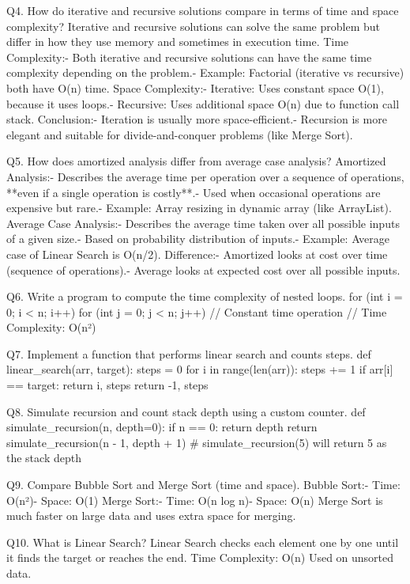 Q4. How do iterative and recursive solutions compare in terms of time and space
 complexity?
 Iterative and recursive solutions can solve the same problem but differ in how they use memory and
 sometimes in execution time.
 Time Complexity:- Both iterative and recursive solutions can have the same time complexity depending on the
 problem.- Example: Factorial (iterative vs recursive) both have O(n) time.
 Space Complexity:- Iterative: Uses constant space O(1), because it uses loops.- Recursive: Uses additional space O(n) due to function call stack.
 Conclusion:- Iteration is usually more space-efficient.- Recursion is more elegant and suitable for divide-and-conquer problems (like Merge Sort).


 Q5. How does amortized analysis differ from average case analysis?
 Amortized Analysis:- Describes the average time per operation over a sequence of operations, **even if a single
 operation is costly**.- Used when occasional operations are expensive but rare.- Example: Array resizing in dynamic array (like ArrayList).
 Average Case Analysis:- Describes the average time taken over all possible inputs of a given size.- Based on probability distribution of inputs.- Example: Average case of Linear Search is O(n/2).
 Difference:- Amortized looks at cost over time (sequence of operations).- Average looks at expected cost over all possible inputs.


 Q6. Write a program to compute the time complexity of nested loops.
 for (int i = 0; i < n; i++) {
 for (int j = 0; j < n; j++) {
 // Constant time operation
 }
 }
 // Time Complexity: O(n²)


 Q7. Implement a function that performs linear search and counts steps.
 def linear_search(arr, target):
 steps = 0
 for i in range(len(arr)):
 steps += 1
 if arr[i] == target:
 return i, steps
 return -1, steps


 Q8. Simulate recursion and count stack depth using a custom counter.
def simulate_recursion(n, depth=0):
 if n == 0:
 return depth
 return simulate_recursion(n - 1, depth + 1)
 # simulate_recursion(5) will return 5 as the stack depth


 Q9. Compare Bubble Sort and Merge Sort (time and space).
 Bubble Sort:- Time: O(n²)- Space: O(1)
 Merge Sort:- Time: O(n log n)- Space: O(n)
 Merge Sort is much faster on large data and uses extra space for merging.


 Q10. What is Linear Search?
 Linear Search checks each element one by one until it finds the target or reaches the end.
 Time Complexity: O(n)
 Used on unsorted data.



